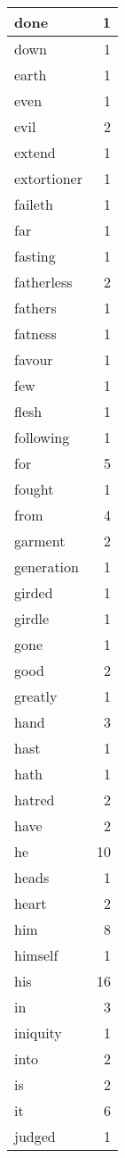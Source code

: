 \begin{center}
\begin{longtable}{l|r}
done & 1 \\ \hline
down & 1 \\ \hline
earth & 1 \\ \hline
even & 1 \\ \hline
evil & 2 \\ \hline
extend & 1 \\ \hline
extortioner & 1 \\ \hline
faileth & 1 \\ \hline
far & 1 \\ \hline
fasting & 1 \\ \hline
fatherless & 2 \\ \hline
fathers & 1 \\ \hline
fatness & 1 \\ \hline
favour & 1 \\ \hline
few & 1 \\ \hline
flesh & 1 \\ \hline
following & 1 \\ \hline
for & 5 \\ \hline
fought & 1 \\ \hline
from & 4 \\ \hline
garment & 2 \\ \hline
generation & 1 \\ \hline
girded & 1 \\ \hline
girdle & 1 \\ \hline
gone & 1 \\ \hline
good & 2 \\ \hline
greatly & 1 \\ \hline
hand & 3 \\ \hline
hast & 1 \\ \hline
hath & 1 \\ \hline
hatred & 2 \\ \hline
have & 2 \\ \hline
he & 10 \\ \hline
heads & 1 \\ \hline
heart & 2 \\ \hline
him & 8 \\ \hline
himself & 1 \\ \hline
his & 16 \\ \hline
in & 3 \\ \hline
iniquity & 1 \\ \hline
into & 2 \\ \hline
is & 2 \\ \hline
it & 6 \\ \hline
judged & 1 \\ \hline

\end{longtable}
\end{center}
